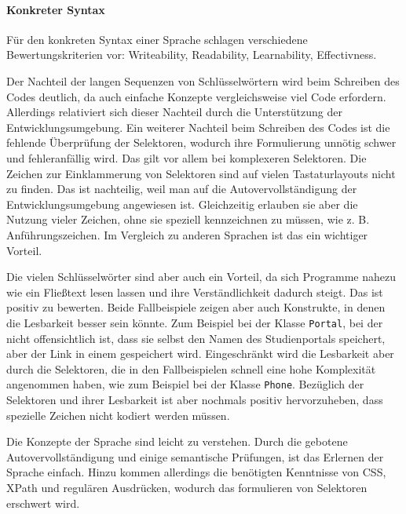     \paragraph{Konkreter Syntax}
    Für den konkreten Syntax einer Sprache schlagen \citet[Kapitel 4.7]{voelter:DslEngineering}
    verschiedene Bewertungskriterien vor: Writeability, Readability, Learnability, Effectivness.

    Der Nachteil der langen Sequenzen von Schlüsselwörtern wird beim Schreiben des Codes
    deutlich, da auch einfache Konzepte vergleichsweise viel Code erfordern.
    Allerdings relativiert sich dieser Nachteil durch die Unterstützung der Entwicklungsumgebung.
    Ein weiterer Nachteil beim Schreiben des Codes ist die fehlende Überprüfung der
    Selektoren, wodurch ihre Formulierung unnötig schwer und fehleranfällig wird.
    Das gilt vor allem bei komplexeren Selektoren.
    Die Zeichen zur Einklammerung von Selektoren sind auf vielen Tastaturlayouts nicht zu finden.
    Das ist nachteilig, weil man auf die Autovervollständigung der Entwicklungsumgebung angewiesen ist.
    Gleichzeitig erlauben sie aber die Nutzung vieler Zeichen, ohne sie speziell kennzeichnen zu müssen,
    wie z. B. Anführungszeichen.
    Im Vergleich zu anderen Sprachen ist das ein wichtiger Vorteil.

    Die vielen Schlüsselwörter sind aber auch ein Vorteil,
    da sich Programme nahezu wie ein Fließtext lesen lassen
    und ihre Verständlichkeit dadurch steigt.
    Das ist positiv zu bewerten.
    Beide Fallbeispiele zeigen aber auch Konstrukte,
    in denen die Lesbarkeit besser sein könnte.
    Zum Beispiel bei der Klasse \texttt{Portal},
    bei der nicht offensichtlich ist,
    dass sie selbst den Namen des Studienportals speichert,
    aber der Link in einem {\childFeature} gespeichert wird.
    Eingeschränkt wird die Lesbarkeit aber durch die Selektoren,
    die in den Fallbeispielen schnell eine hohe Komplexität angenommen haben,
    wie zum Beispiel bei der Klasse \texttt{Phone}.
    Bezüglich der Selektoren und ihrer Lesbarkeit ist aber nochmals
    positiv hervorzuheben, dass spezielle Zeichen nicht kodiert werden müssen.

    Die Konzepte der Sprache sind leicht zu verstehen.
    Durch die gebotene Autovervollständigung und einige
    semantische Prüfungen, ist das Erlernen der Sprache einfach.
    Hinzu kommen allerdings die benötigten Kenntnisse von CSS, XPath und regulären Ausdrücken,
    wodurch das formulieren von Selektoren erschwert wird.

